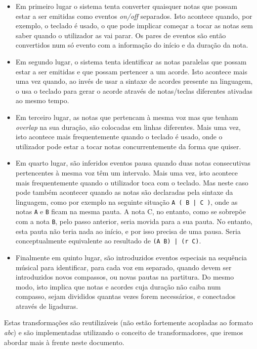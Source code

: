 \begin{itemize}
 \item Em primeiro lugar o sistema tenta converter quaisquer notas que possam estar a ser emitidas como eventos \textit{on/off} separados. Isto acontece quando, por exemplo, o teclado é usado, o que pode implicar começar a tocar as notas sem saber quando o utilizador as vai parar. Os pares de eventos são então convertidos num só evento com a informação do início e da duração da nota.
 \item Em segundo lugar, o sistema tenta identificar as notas paralelas que possam estar a ser emitidas e que possam pertencer a um acorde. Isto acontece mais uma vez quando, ao invés de usar a sintaxe de acordes presente na linguagem, o usa o teclado para gerar o acorde através de notas/teclas diferentes ativadas ao mesmo tempo.
 \item Em terceiro lugar, as notas que pertencam à mesma voz mas que tenham \textit{overlap} na sua duração, são colocadas em linhas diferentes. Mais uma vez, isto acontece mais frequentemente quando o teclado é usado, onde o utilizador pode estar a tocar notas concurrentemente da forma que quiser.
 \item Em quarto lugar, são inferidos eventos pausa quando duas notas consecutivas pertencentes à mesma voz têm um intervalo. Mais uma vez, isto acontece mais frequentemente quando o utilizador toca com o teclado. Mas neste caso pode também acontecer quando as notas são declaradas pela sintaxe da linguagem, como por exemplo na seguinte situação \texttt{A ( B | C )}, onde as notas \texttt{A} e \texttt{B} ficam na mesma pauta. A nota C, no entanto, como se sobrepõe com a nota \texttt{B}, pelo passo anterior, seria movida para a sua pauta. No entanto, esta pauta não teria nada ao início, e por isso precisa de uma pausa. Seria conceptualmente equivalente ao resultado de \texttt{(A B) | (r C)}.
 \item Finalmente em quinto lugar, são introduzidos eventos especiais na sequência músical para identificar, para cada voz em separado, quando devem ser introduzidos novos compassos, ou novas pautas na partitura. Do mesmo modo, isto implica que notas e acordes cuja duração não caiba num compasso, sejam divididos quantas vezes forem necessários, e conectados através de \gls{ligaduras}.
\end{itemize}

Estas transformações são reutilizáveis (não estão fortemente acopladas ao formato \textit{abc}) e são implementadas utilizando o conceito de transformadores, que iremos abordar mais à frente neste documento.


